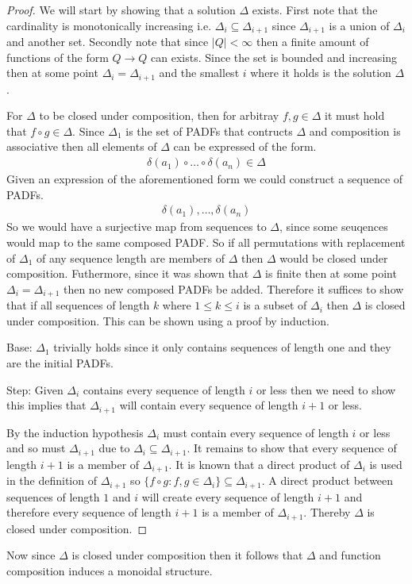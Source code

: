 \documentclass[a4paper,12pt]{article}
\theoremstyle{definition}
\begin{document}
\begin{proof}
  We will start by showing that a solution $\Delta$ exists. First note that the cardinality is monotonically increasing i.e. $\Delta_i \subseteq \Delta_{i + 1}$ since $\Delta_{i + 1}$ is a union of $\Delta_i$ and another set. Secondly note that since $|Q| < \infty$ then a finite amount of functions of the form $Q \to Q$ can exists. Since the set is bounded and increasing then at some point $\Delta_i = \Delta_{i + 1}$ and the smallest $i$ where it holds is the solution $\Delta$.

  For $\Delta$ to be closed under composition, then for arbitray $f, g \in \Delta$ it must hold that $f \circ g \in \Delta$. Since $\Delta_1$ is the set of PADFs that contructs $\Delta$ and composition is associative then all elements of $\Delta$ can be expressed of the form.
  \begin{align*}
    \delta(a_1) \circ \dots \circ \delta(a_n) \in \Delta
  \end{align*}
  Given an expression of the aforementioned form we could construct a sequence of PADFs.
  \begin{align*}
    \delta(a_1), \dots, \delta(a_n)
  \end{align*}
  So we would have a surjective map from sequences to $\Delta$, since some seuqences would map to the same composed PADF. So if all permutations with replacement of $\Delta_1$ of any sequence length are members of $\Delta$ then $\Delta$ would be closed under composition. Futhermore, since it was shown that $\Delta$ is finite then at some point $\Delta_i = \Delta_{i + 1}$ then no new composed PADFs be added. Therefore it suffices to show that if all sequences of length $k$ where $1 \leq k \leq i$ is a subset of $\Delta_i$ then $\Delta$ is closed under composition. This can be shown using a proof by induction.

  Base: $\Delta_1$ trivially holds since it only contains sequences of length one and they are the initial PADFs.

  Step: Given $\Delta_i$ contains every sequence of length $i$ or less then we need to show this implies that $\Delta_{i + 1}$ will contain every sequence of length $i + 1$ or less.

  By the induction hypothesis $\Delta_{i}$ must contain every sequence of length $i$ or less and so must $\Delta_{i + 1}$ due to $\Delta_i \subseteq \Delta_{i + 1}$. It remains to show that every sequence of length $i + 1$ is a member of $\Delta_{i + 1}$. It is known that a direct product of $\Delta_i$ is used in the definition of $\Delta_{i + 1}$ so $\{f \circ g : f, g \in \Delta_i\} \subseteq \Delta_{i + 1}$. A direct product between sequences of length $1$ and $i$ will create every sequence of length $i + 1$ and therefore every sequence of length $i + 1$ is a member of $\Delta_{i + 1}$. Thereby $\Delta$ is closed under composition.
\end{proof}
\noindent Now since $\Delta$ is closed under composition then it follows that $\Delta$ and function composition induces a monoidal structure.
\end{document}
